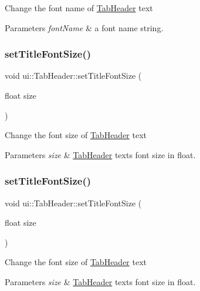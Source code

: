 Change the font name of \hyperlink{classui_1_1TabHeader}{Tab\+Header} text 
\begin{DoxyParams}{Parameters}
{\em font\+Name} & a font name string. \\
\hline
\end{DoxyParams}
\mbox{\label{classui_1_1TabHeader_a33acd32f08867b83ae4f598c2b524e78}} 
\subsubsection{\texorpdfstring{set\+Title\+Font\+Size()}{setTitleFontSize()}\hspace{0.1cm}{\footnotesize\ttfamily [1/2]}}
{\footnotesize\ttfamily void ui\+::\+Tab\+Header\+::set\+Title\+Font\+Size (\begin{DoxyParamCaption}\item[{float}]{size }\end{DoxyParamCaption})}

Change the font size of \hyperlink{classui_1_1TabHeader}{Tab\+Header} text 
\begin{DoxyParams}{Parameters}
{\em size} & \hyperlink{classui_1_1TabHeader}{Tab\+Header} text\textquotesingle{}s font size in float. \\
\hline
\end{DoxyParams}
\mbox{\label{classui_1_1TabHeader_a33acd32f08867b83ae4f598c2b524e78}} 
\subsubsection{\texorpdfstring{set\+Title\+Font\+Size()}{setTitleFontSize()}\hspace{0.1cm}{\footnotesize\ttfamily [2/2]}}
{\footnotesize\ttfamily void ui\+::\+Tab\+Header\+::set\+Title\+Font\+Size (\begin{DoxyParamCaption}\item[{float}]{size }\end{DoxyParamCaption})}

Change the font size of \hyperlink{classui_1_1TabHeader}{Tab\+Header} text 
\begin{DoxyParams}{Parameters}
{\em size} & \hyperlink{classui_1_1TabHeader}{Tab\+Header} text\textquotesingle{}s font size in float. \\
\hline
\end{DoxyParams}
\mbox{\label{classui_1_1TabHeader_a48acc817abd1b8ea56653f3e3d810c9e}} 
